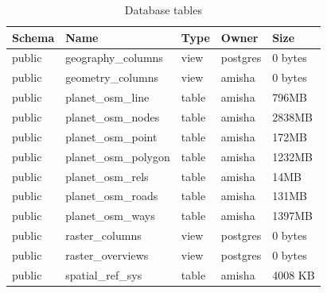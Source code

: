 \begin{table}[h!]
	\caption{Database tables}

	\begin{tabular}{|p{2cm}|p{4.5cm}|p{2.5cm}|p{2cm}|p{2cm}|}
		\hline
		Schema & Name & Type & Owner
		& Size \\

		\hline \rule[-2ex]{0pt}{5.5ex}
		public & geography\_columns & view
		& postgres & 0 bytes\\


                \hline \rule[-2ex]{0pt}{5.5ex}
                public & geometry\_columns & view
                & amisha & 0 bytes\\


                \hline \rule[-2ex]{0pt}{5.5ex}
                public & planet\_osm\_line & table
                & amisha & 796MB\\

               \hline \rule[-2ex]{0pt}{5.5ex}
                public & planet\_osm\_nodes & table
                & amisha & 2838MB\\

               \hline \rule[-2ex]{0pt}{5.5ex}
                public & planet\_osm\_point & table
                & amisha & 172MB\\

               \hline \rule[-2ex]{0pt}{5.5ex}
                public & planet\_osm\_polygon & table
                & amisha & 1232MB\\

               \hline \rule[-2ex]{0pt}{5.5ex}
                public & planet\_osm\_rels & table
                & amisha & 14MB\\

               \hline \rule[-2ex]{0pt}{5.5ex}
                public & planet\_osm\_roads & table
                & amisha & 131MB\\

               \hline \rule[-2ex]{0pt}{5.5ex}
                public & planet\_osm\_ways & table
                & amisha & 1397MB\\

                \hline \rule[-2ex]{0pt}{5.5ex}
                public & raster\_columns & view
                & postgres & 0 bytes\\

                \hline \rule[-2ex]{0pt}{5.5ex}
                public & raster\_overviews & view
                & postgres & 0 bytes\\

                \hline \rule[-2ex]{0pt}{5.5ex}
                public & spatial\_ref\_sys & table
                & amisha & 4008 KB\\


		\hline
	\end{tabular}
\end{table}

